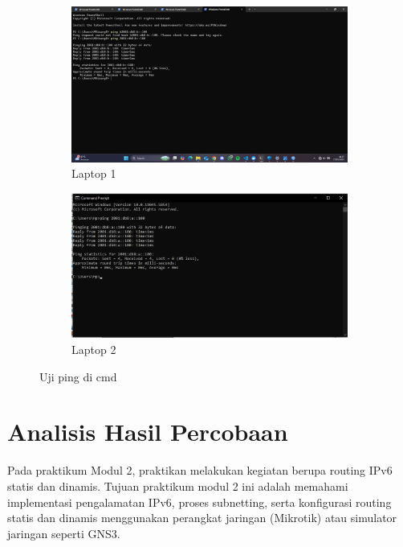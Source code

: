 \begin{figure}[H]
    \centering
    \begin{subfigure}[b]{0.3\linewidth}
      \centering
      \includegraphics[width=\linewidth]{image/dinamis10.jpg}
      \caption{Laptop 1}
    \end{subfigure}
    \hspace{1cm}
    \begin{subfigure}[b]{0.3\linewidth}
      \centering
      \includegraphics[width=\linewidth]{image/dinamis9.png}
      \caption{Laptop 2}
    \end{subfigure}
    \caption{Uji ping di cmd}
\end{figure}

\section{Analisis Hasil Percobaan}
Pada praktikum Modul 2, praktikan melakukan kegiatan berupa routing IPv6 statis dan dinamis. Tujuan praktikum modul 2 ini adalah memahami implementasi pengalamatan IPv6, proses subnetting, serta konfigurasi routing statis dan dinamis menggunakan perangkat jaringan (Mikrotik) atau simulator jaringan seperti GNS3.
